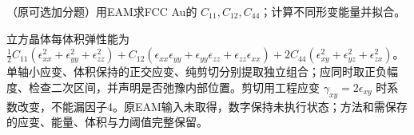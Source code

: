 \begin{exercise}\label{task:lab1-extra}
（原可选加分题）用EAM求FCC Au的 $C_{11},C_{12},C_{44}$；计算不同形变能量并拟合。
\end{exercise}
\begin{solution}
立方晶体每体积弹性能为 $\tfrac12 C_{11}(\epsilon_{xx}^2+\epsilon_{yy}^2+\epsilon_{zz}^2)+C_{12}(\epsilon_{xx}\epsilon_{yy}+\epsilon_{yy}\epsilon_{zz}+\epsilon_{zz}\epsilon_{xx})+2C_{44}(\epsilon_{xy}^2+\epsilon_{yz}^2+\epsilon_{zx}^2)$。单轴小应变、体积保持的正交应变、纯剪切分别提取独立组合；应同时取正负幅度、检查二次区间，并声明是否弛豫内部位置。剪切用工程应变 $\gamma_{xy}=2\epsilon_{xy}$ 时系数改变，不能漏因子4。原EAM输入未取得，数字保持未执行状态；方法和需保存的应变、能量、体积与力阈值完整保留。
\end{solution}

